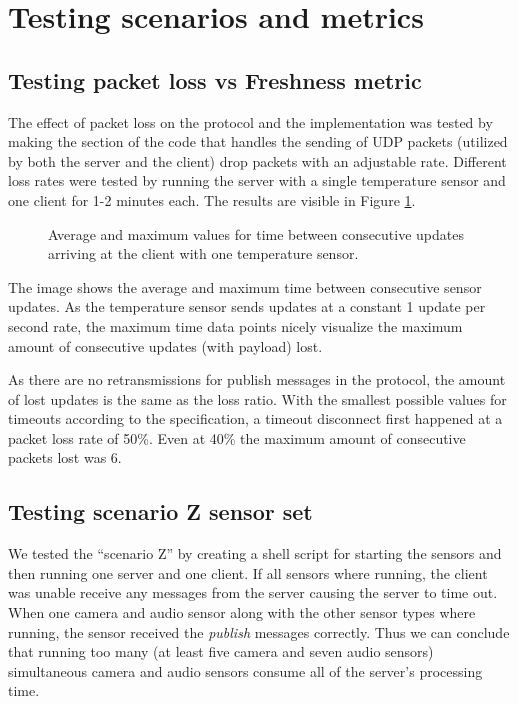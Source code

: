 \documentclass[a4paper]{article}
\begin{document}
\section{Testing scenarios and metrics}


\subsection{Testing packet loss vs Freshness metric}
The effect of packet loss on the protocol and the implementation was tested by 
making the section of the code that handles the sending of UDP packets (utilized
by both the server and the client) drop packets with an adjustable rate.
Different loss rates were tested by running the server with a single temperature
sensor and one client for 1-2 minutes each. The results are visible in Figure 
\ref{fig:lossdata}.

\begin{figure}[h!]
\caption{Average and maximum values for time between consecutive updates arriving at the client with one temperature sensor.} \label{fig:lossdata}
\end{figure}

The image shows the average and maximum time between consecutive sensor updates.
As the temperature sensor sends updates at a constant 1 update per second rate,
the maximum time data points nicely visualize the maximum amount of consecutive
updates (with payload) lost.

As there are no retransmissions for publish messages in the protocol, the amount
of lost updates is the same as the loss ratio. With the smallest possible values
for timeouts according to the specification, a timeout disconnect first happened
at a packet loss rate of 50\%. Even at 40\% the maximum amount of consecutive
packets lost was 6.

\subsection{Testing scenario Z sensor set}
We tested the ``scenario Z'' by creating a shell script
for starting the sensors and then running one server and one client. If all
sensors where running, the client was unable receive any messages from the
server causing the server to time out. When one camera and audio sensor along
with the other sensor types where running, the sensor received the \emph{publish}
messages correctly. Thus we can conclude that running too many (at least five
camera and seven audio sensors) simultaneous camera and audio sensors consume
all of the server's processing time.
\end{document}
